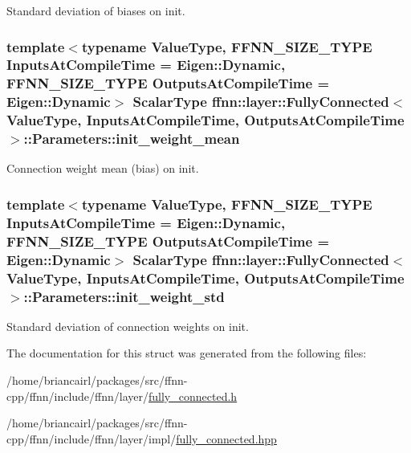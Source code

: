 Standard deviation of biases on init. 

\hypertarget{structffnn_1_1layer_1_1_fully_connected_1_1_parameters_abd0d7b7f6e7220ece91db3f9ab3812be}{
\subsubsection[{init\-\_\-weight\-\_\-mean}]{\setlength{\rightskip}{0pt plus 5cm}template$<$typename Value\-Type, F\-F\-N\-N\-\_\-\-S\-I\-Z\-E\-\_\-\-T\-Y\-P\-E Inputs\-At\-Compile\-Time = Eigen\-::\-Dynamic, F\-F\-N\-N\-\_\-\-S\-I\-Z\-E\-\_\-\-T\-Y\-P\-E Outputs\-At\-Compile\-Time = Eigen\-::\-Dynamic$>$ {\bf Scalar\-Type} {\bf ffnn\-::layer\-::\-Fully\-Connected}$<$ Value\-Type, Inputs\-At\-Compile\-Time, Outputs\-At\-Compile\-Time $>$\-::Parameters\-::init\-\_\-weight\-\_\-mean}}\label{structffnn_1_1layer_1_1_fully_connected_1_1_parameters_abd0d7b7f6e7220ece91db3f9ab3812be}


Connection weight mean (bias) on init. 

\hypertarget{structffnn_1_1layer_1_1_fully_connected_1_1_parameters_af6ab8d97825d77b4cc2d6b4a4870759d}{
\subsubsection[{init\-\_\-weight\-\_\-std}]{\setlength{\rightskip}{0pt plus 5cm}template$<$typename Value\-Type, F\-F\-N\-N\-\_\-\-S\-I\-Z\-E\-\_\-\-T\-Y\-P\-E Inputs\-At\-Compile\-Time = Eigen\-::\-Dynamic, F\-F\-N\-N\-\_\-\-S\-I\-Z\-E\-\_\-\-T\-Y\-P\-E Outputs\-At\-Compile\-Time = Eigen\-::\-Dynamic$>$ {\bf Scalar\-Type} {\bf ffnn\-::layer\-::\-Fully\-Connected}$<$ Value\-Type, Inputs\-At\-Compile\-Time, Outputs\-At\-Compile\-Time $>$\-::Parameters\-::init\-\_\-weight\-\_\-std}}\label{structffnn_1_1layer_1_1_fully_connected_1_1_parameters_af6ab8d97825d77b4cc2d6b4a4870759d}


Standard deviation of connection weights on init. 



The documentation for this struct was generated from the following files\-:\begin{DoxyCompactItemize}
\item 
/home/briancairl/packages/src/ffnn-\/cpp/ffnn/include/ffnn/layer/\hyperlink{fully__connected_8h}{fully\-\_\-connected.\-h}\item 
/home/briancairl/packages/src/ffnn-\/cpp/ffnn/include/ffnn/layer/impl/\hyperlink{layer_2impl_2fully__connected_8hpp}{fully\-\_\-connected.\-hpp}\end{DoxyCompactItemize}
